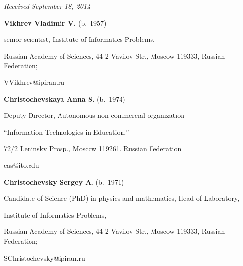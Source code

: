 







\vspace*{-6pt}





\hfill{\small\textit{Received September 18, 2014}}








\Contr





\noindent


\textbf{Vikhrev Vladimir V.} (b.\ 1957)~---


senior scientist, Institute of Informatics Problems,


Russian Academy of Sciences, 44-2 Vavilov Str., Moscow 119333, Russian Federation;


VVikhrev@ipiran.ru





\vspace*{3pt}





\noindent


\textbf{Christochevskaya Anna S.} (b.\ 1974)~---


Deputy Director, Autonomous non-commercial organization


``Information Technologies in Education,''


72/2 Leninsky Prosp.,  Moscow 119261, Russian Federation;


cas@ito.edu





\vspace*{3pt}





\noindent


\textbf{Christochevsky Sergey A.}  (b.\ 1971)~---


Candidate of Science (PhD) in physics and mathematics, Head of Laboratory,


Institute of Informatics Problems,


Russian Academy of Sciences, 44-2 Vavilov Str., Moscow 119333, Russian Federation;


SChristochevsky@ipiran.ru











 \label{end\stat}





\renewcommand{\bibname}{\protect\rm Литература}





